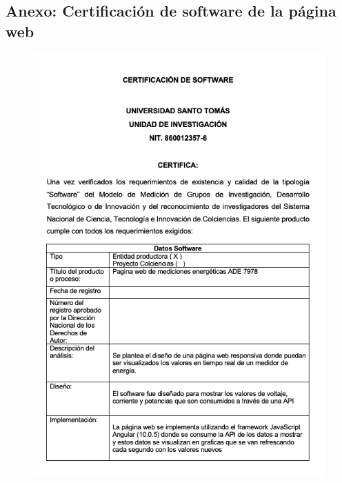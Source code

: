 \begin{appendix}
\chapter{ Anexo: Certificación de software de la página web}
\begin{figure}[H]
    \centering
    \includegraphics[width = 12cm]{Anexos/front-1.png}
    \label{fig:front1}
\end{figure}
\begin{figure}[H]
    \centering

\end{figure}
\end{appendix}
